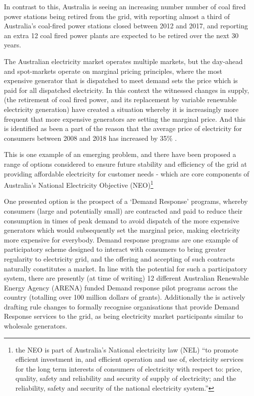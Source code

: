 In contrast to this, Australia is seeing an increasing number number of coal fired power stations being retired from the grid,
with \cite{doi:10.1111/1467-8489.12289} reporting almost a third of Australia's coal-fired power stations closed between 2012 and 2017,
and \cite{australianenergymarketoperatorlimited2018} reporting an extra 12 coal fired power plants are expected to be retired over the next 30 years.

The Australian electricity market operates multiple markets, but the day-ahead and spot-markets operate on marginal pricing principles, where the most expensive generator that is dispatched to meet demand sets the price which is paid for all dispatched electricity.
In this context the witnessed changes in supply, (the retirement of coal fired power, and its replacement by variable renewable electricity generation) have created a situation whereby it is increasingly more frequent that more expensive generators are setting the marginal price.
And this is identified as been a part of the reason that the average price of electricity for consumers between 2008 and 2018 has increased by 35\% \citep{australiancompetitionconsumercommission2018}.

This is one example of an emerging problem, and there have been proposed a range of options considered to ensure future stability and efficiency of the grid at providing affordable electricity for customer needs - which are core components of Australia's National Electricity Objective (NEO)\footnote{the NEO is part of Australia's National electricity law (NEL) ``to promote efficient investment in, and efficient operation and use of, electricity services for the long term interests of consumers of electricity with respect to: price, quality, safety and reliability and security of supply of electricity; and the reliability, safety and security of the national electricity system.''}

One presented option is the prospect of a `Demand Response' programs, whereby consumers (large and potentially small) are contracted and paid to reduce their consumption in times of peak demand to avoid dispatch of the more expensive generators which would subsequently set the marginal price, making electricity more expensive for everybody.
Demand response programs are one example of participatory scheme designed to interact with consumers to bring greater regularity to electricity grid, and the offering and accepting of such contracts naturally constitutes a market.
In line with the potential for such a participatory system, there are presently (at time of writing) 12 different Australian Renewable Energy Agency (ARENA) funded Demand response pilot programs across the country (totalling over 100 million dollars of grants).
Additionally the \cite{australianenergymarketcommission2020} is actively drafting rule changes to formally recognise organisations that provide Demand Response services to the grid, as being electricity market participants similar to wholesale generators.

